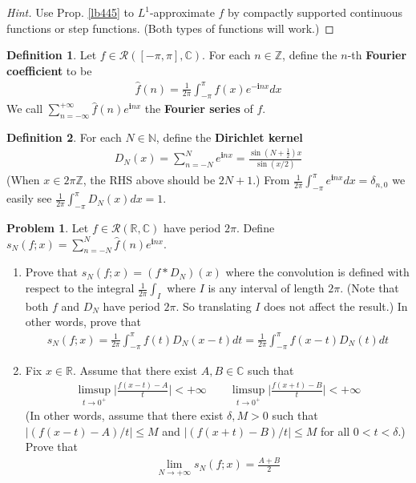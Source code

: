 \documentclass[12pt,b5paper,notitlepage]{article}
\theoremstyle{definition}
\newtheorem{df}{Definition}[section]
\newtheorem{prob}{\color{red}Problem}[section]
\theoremstyle{plain}
\newcommand{\wht}{\widehat}
\newcommand{\scr}{\mathscr}
\newcommand{\im}{\mathbf{i}}
\newcommand{\Cbb}{\mathbb C}
\newcommand{\Nbb}{\mathbb N}
\newcommand{\Zbb}{\mathbb Z}
\newcommand{\Rbb}{\mathbb R}
\newcommand{\dps}{\displaystyle}
\numberwithin{equation}{section}
\begin{document}
\begin{proof}[Hint]
Use Prop. \ref{lb445} to $L^1$-approximate $f$ by compactly supported continuous functions or step functions. (Both types of functions will work.)
\end{proof}


\begin{df}
Let $f\in\scr R([-\pi,\pi],\Cbb)$. For each $n\in\Zbb$, define the $n$-th \textbf{Fourier coefficient} \index{fn@$\wht f(n)$} to be
\begin{align*}
\wht f(n)=\frac 1{2\pi}\int_{-\pi}^\pi f(x)e^{-\im nx}dx
\end{align*}
We call $\dps \sum_{n=-\infty}^{+\infty}\wht f(n)e^{\im nx}$ the \textbf{Fourier series}  of $f$.
\end{df}



\begin{df}
For each $N\in\Nbb$, define the \textbf{Dirichlet kernel} 
\begin{align*}
D_N(x)=\sum_{n=-N}^Ne^{\im nx}=\frac{\sin(N+\frac 12)x}{\sin(x/2)}
\end{align*}
(When $x\in2\pi\Zbb$, the RHS above should be $2N+1$.) From $\frac 1{2\pi}\int_{-\pi}^\pi e^{\im nx}dx=\delta_{n,0}$ we easily see $\dps\frac 1{2\pi}\int_{-\pi}^\pi D_N(x)dx=1$. 
\end{df}


\begin{prob}\label{lb447}
Let $f\in\scr R(\Rbb,\Cbb)$ have period $2\pi$. Define $\dps s_N(f;x)=\sum_{n=-N}^N\wht f(n)e^{\im nx}$.
\begin{enumerate}
\item Prove that $s_N(f;x)=(f*D_N)(x)$ where the convolution is defined with respect to the integral $\frac 1{2\pi}\int_I$ where $I$ is any interval of length $2\pi$. (Note that both $f$ and $D_N$ have period $2\pi$. So translating $I$ does not affect the result.) In other words, prove that
\begin{align}
s_N(f;x)=\frac 1{2\pi}\int_{-\pi}^{\pi} f(t)D_N(x-t)dt=\frac 1{2\pi}\int_{-\pi}^{\pi} f(x-t)D_N(t)dt
\end{align}
\item Fix $x\in\Rbb$. Assume that there exist $A,B\in\Cbb$ such that 
\begin{align}
\limsup_{t\rightarrow 0^+}\Big|\frac{f(x-t)-A}{t}\Big|<+\infty\qquad \limsup_{t\rightarrow 0^+}\Big|\frac{f(x+t)-B}{t}\Big|<+\infty
\end{align}
(In other words, assume that there exist $\delta,M>0$ such that $|(f(x-t)-A)/t|\leq M$ and $|(f(x+t)-B)/t|\leq M$ for all $0<t<\delta$.) Prove that
\begin{align}
\lim_{N\rightarrow+\infty} s_N(f;x)=\frac{A+B}2
\end{align}
\end{enumerate}
\end{prob}
\end{document}
